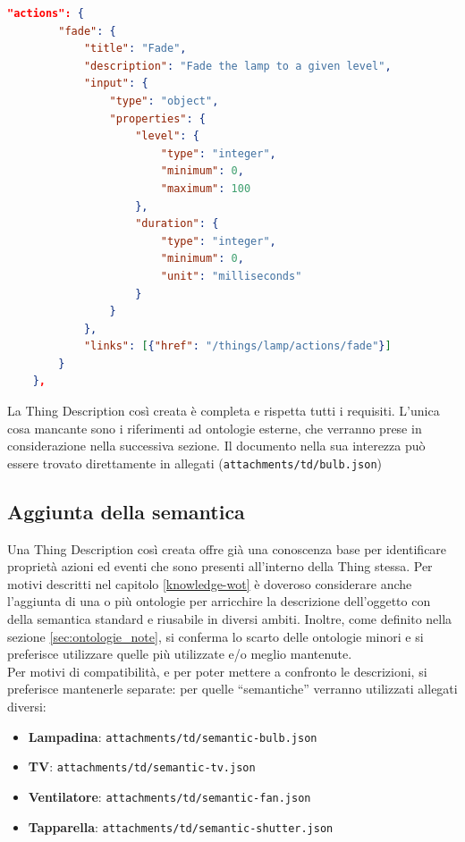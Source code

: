 \documentclass[12pt,a4paper,openright,oneside]{report}
\newcommand{\quotes}[1]{``#1''}
\begin{document}
\clearpage
\begin{lstlisting}[language=json,caption={Azioni di una lampadina},label=lst:start4-td-lamp]
	"actions": {
		"fade": {
			"title": "Fade",
			"description": "Fade the lamp to a given level",
			"input": {
				"type": "object",
				"properties": {
					"level": {
						"type": "integer",
						"minimum": 0,
						"maximum": 100
					},
					"duration": {
						"type": "integer",
						"minimum": 0,
						"unit": "milliseconds"
					}
				}
			},
			"links": [{"href": "/things/lamp/actions/fade"}]
		}
	},
\end{lstlisting}

La Thing Description così creata è completa e rispetta tutti i requisiti. L'unica cosa mancante sono i riferimenti ad ontologie esterne, che verranno prese in considerazione nella successiva sezione. Il documento nella sua interezza può essere trovato direttamente in allegati (\texttt{attachments/td/bulb.json})

\subsection{Aggiunta della semantica}
\label{sec:adding-semantic}
Una Thing Description così creata offre già una conoscenza base per identificare proprietà azioni ed eventi che sono presenti all'interno della Thing stessa. Per motivi descritti nel capitolo \ref{knowledge-wot} è doveroso considerare anche l'aggiunta di una o più ontologie per arricchire la descrizione dell'oggetto con della semantica standard e riusabile in diversi ambiti. Inoltre, come definito nella sezione \ref{sec:ontologie_note}, si conferma lo scarto delle ontologie minori e si preferisce utilizzare quelle più utilizzate e/o meglio mantenute.\\

Per motivi di compatibilità, e per poter mettere a confronto le descrizioni, si preferisce mantenerle separate: per quelle \quotes{semantiche} verranno utilizzati allegati diversi:
\begin{itemize}
	\setlength\itemsep{-0.3em}
	\item \textbf{Lampadina}: \texttt{attachments/td/semantic-bulb.json}
	\item \textbf{TV}: \texttt{attachments/td/semantic-tv.json}
	\item \textbf{Ventilatore}: \texttt{attachments/td/semantic-fan.json}
	\item \textbf{Tapparella}: \texttt{attachments/td/semantic-shutter.json}
\end{itemize}
\end{document}
